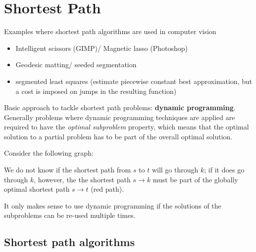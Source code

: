 \setcounter{chapter}{5}
\chapter{Shortest Path}%
\label{chap:06}

Examples where shortest path algorithms are used in computer vision
\begin{itemize}
\item Intelligent scissors (GIMP)/ Magnetic lasso (Photoshop)
\item Geodesic matting/ seeded segmentation
\item segmented least squares (estimate piecewise constant best
  approximation, but a cost is imposed on jumps in the resulting
  function)
\end{itemize}

Basic approach to tackle shortest path problems: \textbf{dynamic
  programming}. Generally problems where dynamic programming
techniques are applied are required to have the \emph{optimal
  subproblem} property, which means that the optimal solution to a
partial problem has to be part of the overall optimal solution.
\begin{example*}
  Consider the following graph:
  \begin{figure}[h!]
    \centering
  \end{figure}
  
  We do not know if the shortest path from $s$ to $t$ will go through
  $k$; if it does go through $k$, however, the the shortest path
  $s \rightarrow k$ must be part of the globally optimal shortest path
  $s \rightarrow t$ (red path).
\end{example*}
It only makes sense to use dynamic programming if the solutions of the
subproblems can be re-used multiple times.

\setcounter{section}{1}
\section{Shortest path algorithms}%
\label{sec:shortpathalgo}

